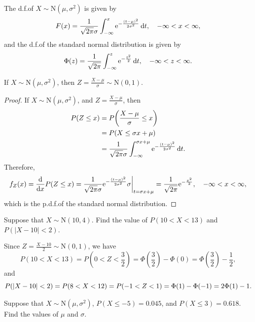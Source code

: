 The d.f.\@ of \(X \sim \mathrm{N}(\mu, \sigma^2)\) is given by
\[
  F(x) = \frac{1}{\sqrt{2\mathrm{\pi}} \sigma} \int_{-\infty}^x \mathrm{e}^{-\frac{(t - \mu)^2}{2\sigma^2}}\,\mathrm{d} t, \quad -\infty < x < \infty,
\]
and the d.f.\@ of the standard normal distribution is given by
\[
  \Phi(z) = \frac{1}{\sqrt{2\mathrm{\pi}}} \int_{-\infty}^z \mathrm{e}^{-\frac{t^2}{2}}\,\mathrm{d} t, \quad -\infty < z < \infty.
\]

\begin{theorem}
  If \(X \sim \mathrm{N}(\mu, \sigma^2)\), then \(Z = \frac{X - \mu}{\sigma} \sim \mathrm{N}(0, 1)\).
\end{theorem}

\begin{proof}
  If \(X \sim \mathrm{N}(\mu, \sigma^2)\), and \(Z = \frac{X - \mu}{\sigma}\), then
  \begin{align*}
    P(Z \leq x) & = P\!\left(\frac{X - \mu}{\sigma} \leq x\right) \\
    & = P(X \leq \sigma x + \mu) \\
    & = \frac{1}{\sqrt{2\mathrm{\pi}} \sigma} \int_{-\infty}^{\sigma x + \mu} \mathrm{e}^{-\frac{(t - \mu)^2}{2\sigma^2}}\,\mathrm{d} t.
  \end{align*}
  Therefore,
  \[
    f_Z(x) = \frac{\mathrm{d}}{\mathrm{d} x} P(Z \leq x) = \frac{1}{\sqrt{2\mathrm{\pi}}\sigma} \mathrm{e}^{-\frac{(t - \mu)^2}{2\sigma^2}} \sigma \bigg|_{t = \sigma x + \mu} = \frac{1}{\sqrt{2\mathrm{\pi}}} \mathrm{e}^{-\frac{x^2}{2}}, \quad -\infty < x < \infty,
  \]
  which is the p.d.f.\@ of the standard normal distribution.
\end{proof}

\begin{example}
  Suppose that \(X \sim \mathrm{N}(10, 4)\). Find the value of \(P(10 < X < 13)\) and \(P(|X - 10| < 2)\).
\end{example}

\begin{solution}
  Since \(Z = \frac{X - 10}{2} \sim \mathrm{N}(0, 1)\), we have
  \[
    P(10 < X < 13) = P\!\left(0 < Z < \frac{3}{2}\right) = \Phi\!\left(\frac{3}{2}\right) - \Phi(0) = \Phi\!\left(\frac{3}{2}\right) - \frac{1}{2},
  \]
  and
  \[
    P(|X - 10| < 2) = P(8 < X < 12) = P\!\left(-1 < Z < 1\right) = \Phi(1) - \Phi(-1) = 2\Phi(1) - 1. \qedhere
  \]
\end{solution}

\begin{example}
  Suppose that \(X \sim \mathrm{N}(\mu, \sigma^2)\), \(P(X \leq -5) = 0.045\), and \(P(X \leq 3) = 0.618\). Find the values of \(\mu\) and \(\sigma\).
\end{example}

